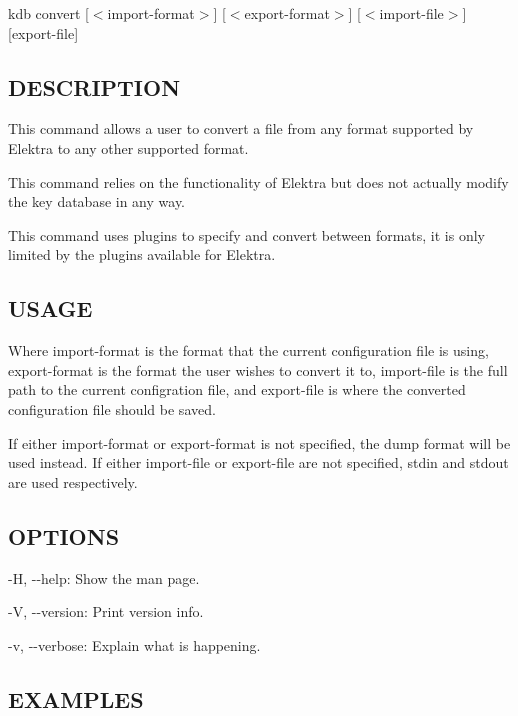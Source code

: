 {\ttfamily kdb convert \mbox{[}$<$import-\/format$>$\mbox{]} \mbox{[}$<$export-\/format$>$\mbox{]} \mbox{[}$<$import-\/file$>$\mbox{]} \mbox{[}export-\/file\mbox{]}}

\subsection*{D\+E\+S\+C\+R\+I\+P\+T\+I\+O\+N}

This command allows a user to convert a file from any format supported by Elektra to any other supported format.

This command relies on the functionality of Elektra but does not actually modify the key database in any way.

This command uses plugins to specify and convert between formats, it is only limited by the plugins available for Elektra.

\subsection*{U\+S\+A\+G\+E}

Where {\ttfamily import-\/format} is the format that the current configuration file is using, {\ttfamily export-\/format} is the format the user wishes to convert it to, {\ttfamily import-\/file} is the full path to the current configration file, and {\ttfamily export-\/file} is where the converted configuration file should be saved.

If either {\ttfamily import-\/format} or {\ttfamily export-\/format} is not specified, the {\ttfamily dump} format will be used instead. If either {\ttfamily import-\/file} or {\ttfamily export-\/file} are not specified, {\ttfamily stdin} and {\ttfamily stdout} are used respectively.

\subsection*{O\+P\+T\+I\+O\+N\+S}


\begin{DoxyItemize}
\item {\ttfamily -\/\+H}, {\ttfamily -\/-\/help}\+: Show the man page.
\item {\ttfamily -\/\+V}, {\ttfamily -\/-\/version}\+: Print version info.
\item {\ttfamily -\/v}, {\ttfamily -\/-\/verbose}\+: Explain what is happening.
\end{DoxyItemize}

\subsection*{E\+X\+A\+M\+P\+L\+E\+S}

